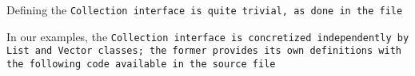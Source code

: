 Defining the \tt{Collection} interface is quite trivial,
as done in the file 

In our examples, the \tt{Collection} interface is concretized independently by
\tt{List} and \tt{Vector} classes; the former provides its own definitions with
the following code available in the source file 
